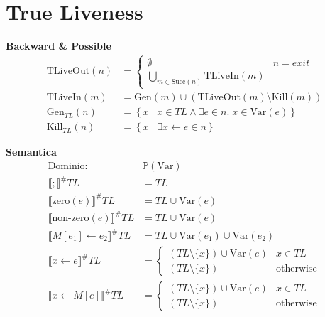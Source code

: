 \documentclass[a4paper,12pt,openany]{article}
\newcommand{\TL}{T\!L}
\begin{document}
    
    \clearpage\section*{True Liveness}
    \textbf{Backward \& Possible}
    \begin{align*}
    \mbox{TLiveOut}(n) &=
    \begin{cases}
    \emptyset & n = exit\\
    \bigcup\limits_{m\in \mbox{Succ}(n)} \mbox{TLiveIn}(m)
    \end{cases}\\
    \mbox{TLiveIn}(m) &= \mbox{Gen}(m) \cup (\mbox{TLiveOut}(m) \setminus \mbox{Kill}(m))\\
    \mbox{Gen}_{\TL}(n) &= \left\{
    x \;\big\vert\; x \in \TL \land \exists e \in n.\; x\in\mbox{Var}(e)
    \right\}\\
    \mbox{Kill}_{\TL}(n) &= \left\{
    x \;\big\vert\; \exists x\leftarrow e \in n
    \right\}
    \end{align*}
    
    \textbf{Semantica}
    \begin{align*}
    \mbox{Dominio: }& \mathbb{P}(\mbox{Var})\\
    \llbracket ; \rrbracket^\#\TL &= \TL\\
    \llbracket \mbox{zero}(e) \rrbracket^\#\TL &= \TL \cup \mbox{Var}(e)\\
    \llbracket \mbox{non-zero}(e) \rrbracket^\#\TL &= \TL \cup \mbox{Var}(e)\\
    \llbracket M[e_1]\leftarrow e_2 \rrbracket^\#\TL &= \TL \cup \mbox{Var}(e_1) \cup \mbox{Var}(e_2)\\
    \llbracket x \leftarrow e \rrbracket^\#\TL &=
    \begin{cases}
        (\TL\setminus \{x\}) \cup \mbox{Var}(e) & x\in\TL\\
        (\TL\setminus \{x\}) & \mbox{otherwise}
    \end{cases}\\
    \llbracket x\leftarrow M[e] \rrbracket^\#\TL &=
    \begin{cases}
        (\TL\setminus \{x\}) \cup \mbox{Var}(e) & x\in\TL\\
        (\TL\setminus \{x\}) & \mbox{otherwise}
    \end{cases}\\
    \end{align*}
\end{document}
